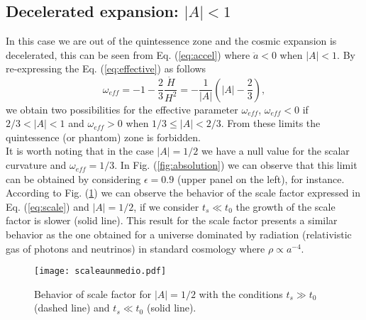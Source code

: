 \documentclass[twocolumn,showpacs,nofootinbib,floats,amsmath,amssymb]{revtex4}
\begin{document}
\subsection{Decelerated expansion: $\left|A\right| < 1$}
In this case we are out of the quintessence zone and the cosmic expansion is decelerated, this can be seen from Eq. (\ref{eq:accel}) where $\ddot{a} < 0$ when $\left|A\right| < 1$. By re-expressing the Eq. (\ref{eq:effective}) as follows
\begin{equation}
\omega_{eff} = -1-\frac{2}{3}\frac{\dot{H}}{H^{2}} = -\frac{1}{\left|A\right|}\left(\left|A\right|-\frac{2}{3}\right),
\label{eq:effective2}
\end{equation}
we obtain two possibilities for the effective parameter $\omega_{eff}$, $\omega_{eff} < 0$ if $2/3 < \left|A\right| < 1$ and $\omega_{eff} > 0$ when $ 1/3 \leq \left|A\right| < 2/3$. From these limits the quintessence (or phantom) zone is forbidden.\\ 
It is worth noting that in the case $\left|A\right| = 1/2$ we have a null value for the scalar curvature and $\omega_{eff} = 1/3$. In Fig. (\ref{fig:absolution}) we can observe that this limit can be obtained by considering $\epsilon = 0.9$ (upper panel on the left), for instance. According to Fig. (\ref{fig:scaleunmedio}) we can observe the behavior of the scale factor expressed in Eq. (\ref{eq:scale}) and $\left|A\right| = 1/2$, if we consider $t_{s} \ll t_{0}$ the growth of the scale factor is slower (solid line). This result for the scale factor presents a similar behavior as the one obtained for a universe dominated by radiation (relativistic gas of photons and neutrinos) in standard cosmology where $\rho \propto a^{-4}$. 
\begin{figure}[H]
\centering
\texttt{[image: scaleaunmedio.pdf]}
\caption{Behavior of scale factor for $\left|A\right| = 1/2$ with the conditions $t_{s} \gg t_{0}$ (dashed line) and $t_{s} \ll t_{0}$ (solid line).} 
\label{fig:scaleunmedio}
\end{figure}
\end{document}
